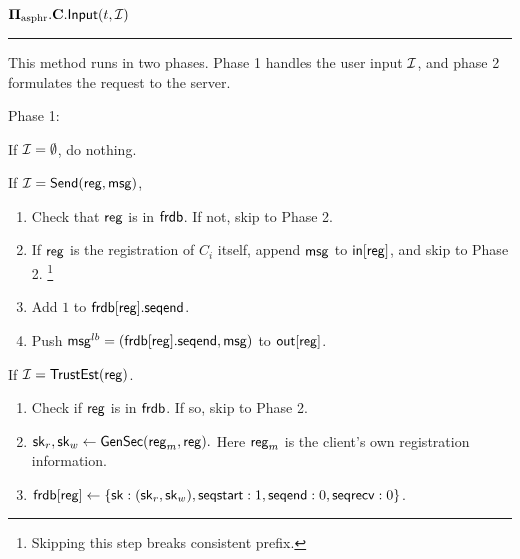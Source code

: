 \begin{definition}
\vspace{10pt}
$\mathbf{\Pi_{\text{asphr}}.C.\mathsf{Input}}(t, \mathcal{I})$
\vspace{5pt}
\hrule
\vspace{5pt}
This method runs in two phases. Phase 1 handles the user input $\mathcal{I}$, and phase 2 formulates the request to the server.

Phase 1: 

If $\mathcal{I} = \emptyset$, do nothing. 

If $\mathcal{I} = \mathsf{Send}(\mathsf{reg}, \mathsf{msg})$, 

\begin{enumerate}
    \item Check that $\mathsf{reg}$ is in $\mathsf{frdb}$. If not, skip to Phase 2.
    \item If $\mathsf{reg}$ is the registration of $C_i$ itself, append $\mathsf{msg}$ to $\mathsf{in}[\mathsf{reg}]$, and skip to Phase 2. \footnote{Skipping this step breaks consistent prefix.}
    \item Add $1$ to $\mathsf{frdb}[\mathsf{reg}].\mathsf{seqend}$. 
    \item Push $\mathsf{msg}^{lb} = (\mathsf{frdb}[\mathsf{reg}].\mathsf{seqend}, \mathsf{msg})$ to $\mathsf{out}[\mathsf{reg}]$.
\end{enumerate}

If $\mathcal{I} = \mathsf{TrustEst}(\mathsf{reg})$.
\begin{enumerate}
    \item Check if $\mathsf{reg}$ is in $\mathsf{frdb}$. If so, skip to Phase 2.
    \item ${\mathsf{sk}}_r, {\mathsf{sk}}_w \leftarrow \mathsf{GenSec}(\mathsf{reg}_m, \mathsf{reg}).$ Here $\mathsf{reg}_m$ is the client's own registration information.
    \item $\mathsf{frdb}[\mathsf{reg}] \leftarrow \{{\mathsf{sk}}: ({\mathsf{sk}}_r, {\mathsf{sk}}_w),  \mathsf{seqstart}: 1, \mathsf{seqend}: 0, \\ \mathsf{seqrecv}: 0\}$.
\end{enumerate}


\end{definition}

